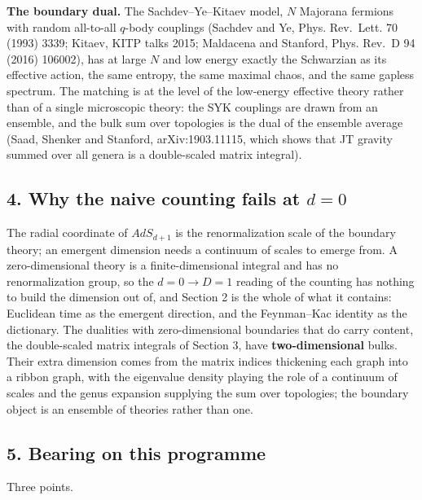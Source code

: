 \documentclass[11pt,a4paper]{article}
\begin{document}
\textbf{The boundary dual.} The Sachdev--Ye--Kitaev model, \(N\)
Majorana fermions with random all-to-all \(q\)-body couplings (Sachdev
and Ye, Phys. Rev.~Lett. 70 (1993) 3339; Kitaev, KITP talks 2015;
Maldacena and Stanford, Phys. Rev.~D 94 (2016) 106002), has at large
\(N\) and low energy exactly the Schwarzian as its effective action, the
same entropy, the same maximal chaos, and the same gapless spectrum. The
matching is at the level of the low-energy effective theory rather than
of a single microscopic theory: the SYK couplings are drawn from an
ensemble, and the bulk sum over topologies is the dual of the ensemble
average (Saad, Shenker and Stanford, arXiv:1903.11115, which shows that
JT gravity summed over all genera is a double-scaled matrix integral).

\hypertarget{why-the-naive-counting-fails-at-d0}{%
\subsection{\texorpdfstring{4. Why the naive counting fails at
\(d=0\)}{4. Why the naive counting fails at d=0}}\label{why-the-naive-counting-fails-at-d0}}

The radial coordinate of \(AdS_{d+1}\) is the renormalization scale of
the boundary theory; an emergent dimension needs a continuum of scales
to emerge from. A zero-dimensional theory is a finite-dimensional
integral and has no renormalization group, so the \(d=0\to D=1\) reading
of the counting has nothing to build the dimension out of, and Section 2
is the whole of what it contains: Euclidean time as the emergent
direction, and the Feynman--Kac identity as the dictionary. The
dualities with zero-dimensional boundaries that do carry content, the
double-scaled matrix integrals of Section 3, have
\textbf{two-dimensional} bulks. Their extra dimension comes from the
matrix indices thickening each graph into a ribbon graph, with the
eigenvalue density playing the role of a continuum of scales and the
genus expansion supplying the sum over topologies; the boundary object
is an ensemble of theories rather than one.

\hypertarget{bearing-on-this-programme}{%
\subsection{5. Bearing on this
programme}\label{bearing-on-this-programme}}

Three points.
\end{document}
